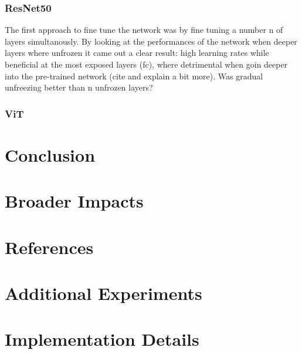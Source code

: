 \documentclass{article}
\begin{document}
\subsubsection{ResNet50}
The first approach to fine tune the network was by fine tuning a number n of layers simultanously. By looking at the performances of the network when deeper layers where unfrozen it came out a clear result: high learning rates while beneficial at the most exposed layers (fc), where detrimental when goin deeper into the pre-trained network (cite and explain a bit more). Was gradual unfreezing better than n unfrozen layers?

\subsubsection{ViT}

\section{Conclusion}


\section{Broader Impacts}


\section*{References}


\appendix
\section{Additional Experiments}


\section{Implementation Details}


\end{document}
